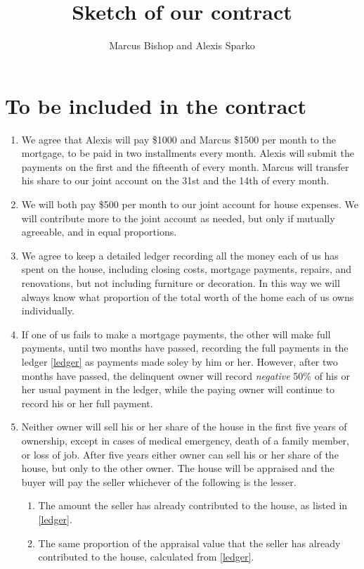 \documentclass[12pt]{article}
\title{Sketch of our contract}
\author{Marcus Bishop and Alexis Sparko}
\begin{document}
\maketitle

\section{To be included in the contract}
\begin{enumerate}

\item We agree that Alexis will pay \$1000 and Marcus \$1500 per 
month to the mortgage, to be paid in two installments every month. 
Alexis will submit the payments on the first and the fifteenth of 
every month. Marcus will transfer his share to our joint account on 
the 31st and the 14th of every month.

\item We will both pay \$500 per month to our joint account for house 
expenses. We will contribute more to the joint account as needed, but 
only if mutually agreeable, and in equal proportions.

\item\label{ledger} We agree to keep a detailed ledger recording all 
the money each of us has spent on the house, including closing costs, 
mortgage payments, repairs, and renovations, but not including 
furniture or decoration. In this way we will always know what 
proportion of the total worth of the home each of us owns 
individually.

\item If one of us fails to make a mortgage payments, the other will 
make full payments, until two months have passed, recording the full 
payments in the ledger \autoref{ledger}
as payments made soley by him or her.
However, after two months have passed,
the delinquent owner will record {\em negative} 50\% 
of his or her usual payment in the ledger, while the paying owner
will continue to record his or her full payment.

\item Neither owner will sell his or her share of the house in the 
first five years of ownership, except in cases of medical emergency, 
death of a family member, or loss of job. After five years either 
owner can sell his or her share of the house, but only
to the other owner. The house will be appraised and the 
buyer will pay the seller whichever of the following is the lesser. 

\begin{enumerate} \item The amount the seller has already contributed 
to the house, as listed in \autoref{ledger}.

\item The same proportion 
of the appraisal value that the seller has already contributed to the 
house, calculated from \autoref{ledger}. \end{enumerate} 
\end{enumerate}
\end{document}
